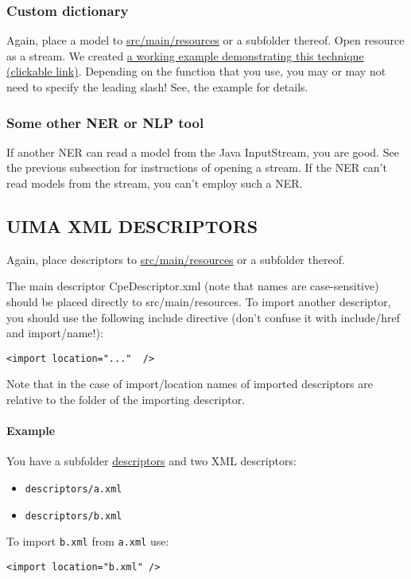 \subsubsection*{Custom dictionary}
Again, place a model to \url{src/main/resources} or a subfolder thereof. 
Open resource as a stream. We created \href{https://github.com/amaiberg/software-engineering-preliminary/tree/master/read_resource_example}{a working example demonstrating this technique (clickable link)}. 
Depending on the function that you use, you may or may not need to specify the leading slash! See, the example for details.

\subsubsection*{Some other NER or NLP tool}

If another NER can read a model from the Java InputStream, you are good. 
See the previous subsection for instructions of opening a stream. 
If the NER can't read models from the stream, you can't employ such a NER.

\subsection*{UIMA XML DESCRIPTORS}
Again, place descriptors to 
\url{src/main/resources} or a subfolder thereof.

The main descriptor CpeDescriptor.xml (note that names are case-sensitive) should be placed directly to src/main/resources. 
To import another descriptor, you should use the following include directive (don't
confuse it with include/href and import/name!):
\begin{verbatim}
<import location="..."  />
\end{verbatim}
Note that in the case of import/location
names of imported descriptors are relative to the folder of the importing descriptor.

\paragraph{Example} You have a subfolder \url{descriptors} and two XML descriptors:
\begin{itemize}
\item \texttt{descriptors/a.xml}
\item \texttt{descriptors/b.xml}
\end{itemize}

To import \texttt{b.xml} from \texttt{a.xml} use:
\begin{verbatim}
<import location="b.xml" />
\end{verbatim}
